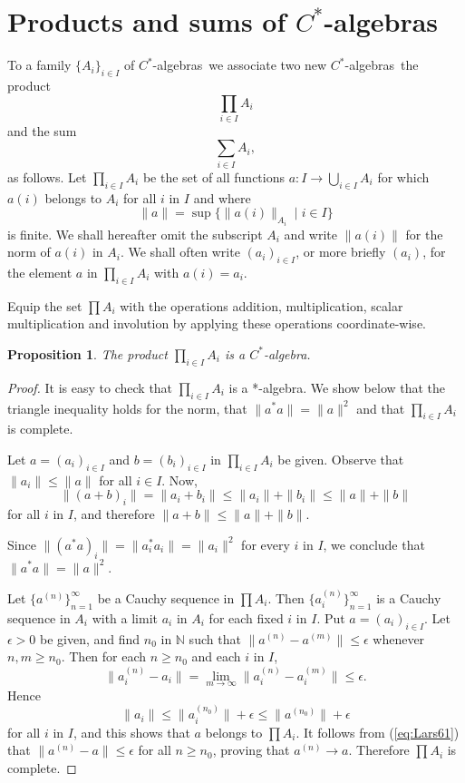 \documentclass{book}
\newtheorem{proposition}[definition]{Proposition}
\def\cstar{\(C^*\)-algebra}
\def\cstars{\(C^*\)-algebras}
\begin{document}
\section{Products and sums of \texorpdfstring{\cstars}{C*-algebras}}
To a family \(\{A_{i}\}_{i\in I}\) of \cstars\ we associate two new \cstars\, the product 
\[
  \prod_{i\in I}A_i
\]
and the sum
\[
  \sum_{i\in I}A_i,
\]
as follows. Let \(\prod_{i\in I}A_i\) be the set of all functions
\(a:I\to \bigcup_{i\in I}A_i\) for which \(a(i)\) belongs to \(A_i\) for 
all \(i\) in \(I\) and where
\[
  \|a\|=\sup\{\|a(i)\|_{A_i}\mid i\in I\}
\]
is finite. We shall hereafter omit the subscript \(A_i\) and write \(\|a(i)\|\) for the
norm of \(a(i)\) in \(A_i\). We shall often write \((a_i)_{i\in I}\), or more briefly \((a_i)\),
for the element \(a\) in \(\prod_{i\in I}A_i\) with \(a(i)=a_i\).\par
Equip the set \(\prod A_i\) with the operations addition, multiplication, scalar multiplication and involution
by applying these operations coordinate-wise.
\begin{proposition}
  The product \(\prod_{i\in I}A_i\) is a \cstar.
\end{proposition}
\begin{proof}
  It is easy to check that \(\prod_{i\in I}A_i\) is a *-algebra. We show below that the 
  triangle inequality holds for the norm, that \(\|a^*a\|=\|a\|^2\) and that \(\prod_{i\in I}A_i\) is complete.\par
  Let \(a=(a_i)_{i\in I}\) and \(b=(b_i)_{i\in I}\) in \(\prod_{i\in I}A_i\) be given. Observe that \(\|a_i\|\leq\|a\|\)
  for all \(i\in I\). Now,
  \[
    \|(a+b)_i\|=\|a_i+b_i\|\leq\|a_i\|+\|b_i\|\leq\|a\|+\|b\|
  \]  
  for all \(i\) in \(I\), and therefore \(\|a+b\|\leq\|a\|+\|b\|\).\par
  Since \(\|(a^*a)_i\|=\|a_i^*a_i\|=\|a_i\|^2\) for every \(i\) in \(I\), we conclude that
  \(\|a^*a\|=\|a\|^2\).\par
  Let \(\{a^{(n)}\}_{n=1}^\infty\) be a Cauchy sequence in \(\prod A_i\). Then \(\{a_i^{(n)}\}_{n=1}^\infty\) is a Cauchy
  sequence in \(A_i\) with a limit \(a_i\) in \(A_i\) for each fixed \(i\) in \(I\). Put \(a=(a_i)_{i\in I}\).
  Let \(\epsilon>0\) be given, and find \(n_0\) in \(\mathbb{N}\) such that \(\|a^{(n)}-a^{(m)}\|\leq\epsilon\) whenever
  \(n,m\geq n_0\). Then for each \(n\geq n_0\) and each \(i\) in \(I\),
  \begin{equation}\label{eq:Lars61}
    \|a_i^{(n)}-a_i\|=\lim_{m\to\infty}\|a_i^{(n)}-a_i^{(m)}\|\leq\epsilon.
  \end{equation}
  Hence 
  \[
    \|a_i\|\leq\|a_i^{(n_0)}\|+\epsilon\leq\|a^{(n_0)}\|+\epsilon
  \]
  for all \(i\) in \(I\), and this shows that \(a\) belongs to \(\prod A_i\). It follows
  from (\ref{eq:Lars61}) that \(\|a^{(n)}-a\|\leq\epsilon\) for all \(n\geq n_0\), proving that \(a^{(n)}\to a\).
  Therefore \(\prod A_i\) is complete.
\end{proof}
\end{document}
